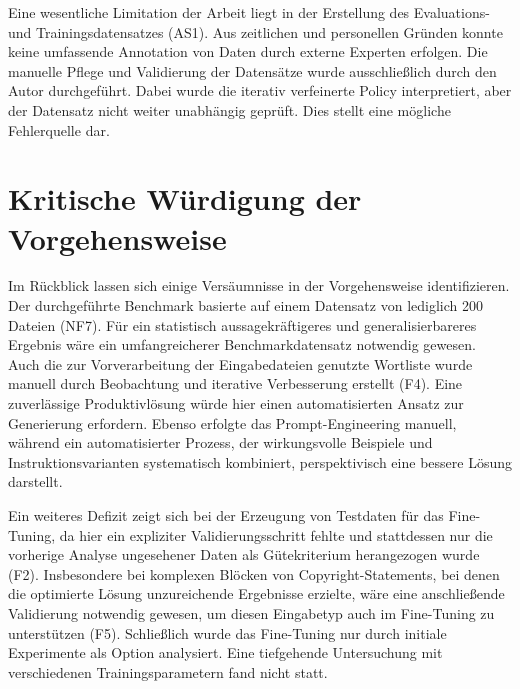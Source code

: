 Eine wesentliche Limitation der Arbeit liegt in der Erstellung des Evaluations- und Trainingsdatensatzes (AS1).
Aus zeitlichen und personellen Gründen konnte keine umfassende Annotation von Daten durch externe Experten erfolgen.
Die manuelle Pflege und Validierung der Datensätze wurde ausschließlich durch den Autor durchgeführt.
Dabei wurde die iterativ verfeinerte Policy interpretiert, aber der Datensatz nicht weiter unabhängig geprüft.
Dies stellt eine mögliche Fehlerquelle dar.


\section{Kritische Würdigung der Vorgehensweise}

Im Rückblick lassen sich einige Versäumnisse in der Vorgehensweise identifizieren.
Der durchgeführte Benchmark basierte auf einem Datensatz von lediglich \num{200} Dateien (NF7).
Für ein statistisch aussagekräftigeres und generalisierbareres Ergebnis wäre ein umfangreicherer Benchmarkdatensatz notwendig gewesen.
Auch die zur Vorverarbeitung der Eingabedateien genutzte Wortliste wurde manuell durch Beobachtung und iterative Verbesserung erstellt (F4).
Eine zuverlässige Produktivlösung würde hier einen automatisierten Ansatz zur Generierung erfordern.
Ebenso erfolgte das Prompt-Engineering manuell, während ein automatisierter Prozess, der wirkungsvolle Beispiele und Instruktionsvarianten systematisch kombiniert, perspektivisch eine bessere Lösung darstellt.

Ein weiteres Defizit zeigt sich bei der Erzeugung von Testdaten für das Fine-Tuning, da hier ein expliziter Validierungsschritt fehlte und stattdessen nur die vorherige Analyse ungesehener Daten als Gütekriterium herangezogen wurde (F2).
Insbesondere bei komplexen Blöcken von Copyright-Statements, bei denen die optimierte Lösung unzureichende Ergebnisse erzielte, wäre eine anschließende Validierung notwendig gewesen, um diesen Eingabetyp auch im Fine-Tuning zu unterstützen (F5).
Schließlich wurde das Fine-Tuning nur durch initiale Experimente als Option analysiert.
Eine tiefgehende Untersuchung mit verschiedenen Trainingsparametern fand nicht statt.

